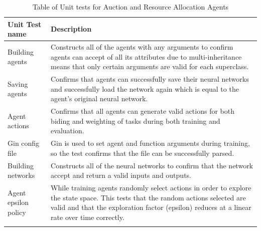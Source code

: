 \begin{longtable}{|p{3cm}|p{11cm}|} \hline
    \textbf{Unit Test name} & \textbf{Description} \\ \hline
    Building agents & Constructs all of the agents with any arguments to confirm agents can accept of all its
        attributes due to multi-inheritance means that only certain arguments are valid for each superclass. \\ \hline
    Saving agents & Confirms that agents can successfully save their neural networks and successfully load
        the network again which is equal to the agent's original neural network. \\ \hline
    Agent actions & Confirms that all agents can generate valid actions for both biding and weighting of tasks during
        both training and evaluation. \\ \hline
    Gin config file & Gin is used to set agent and function arguments during training, so the test confirms that the
        file can be successfully parsed. \\ \hline
    Building networks & Constructs all of the neural networks to confirm that the network accept and return a valid
        inputs and outputs. \\ \hline
    Agent epsilon policy & While training agents randomly select actions in order to explore the state space.
        This tests that the random actions selected are valid and that the exploration factor (epsilon) reduces at a
        linear rate over time correctly. \\ \hline
    \caption{Table of Unit tests for Auction and Resource Allocation Agents}
    \label{tab:agent-unit-tests}
\end{longtable}

